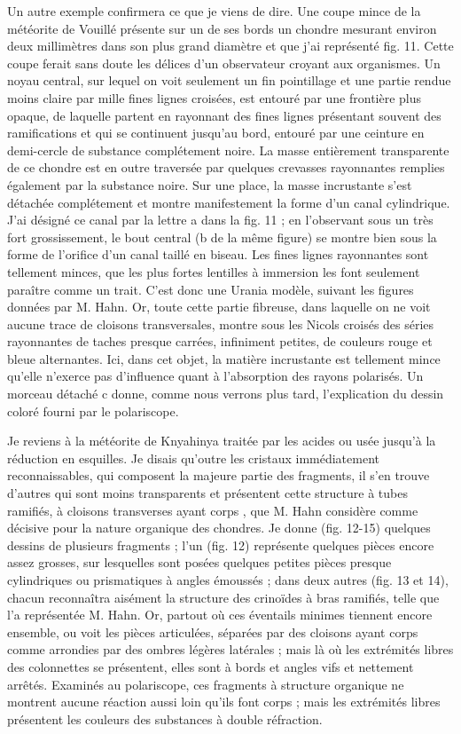\documentclass[a4paper, 12pt, oneside, french]{article}
\begin{document}
Un autre exemple confirmera ce que je viens de dire. Une coupe mince de la météorite de Vouillé présente sur un de ses bords un chondre mesurant environ deux millimètres dans son plus grand diamètre et que j'ai représenté fig. 11. Cette coupe ferait sans doute les délices d'un observateur croyant aux organismes. Un noyau central, sur lequel on voit seulement un fin pointillage et une partie rendue moins claire par mille fines lignes croisées, est entouré par une frontière plus opaque, de laquelle partent en rayonnant des fines lignes présentant souvent des ramifications et qui se continuent jusqu'au bord, entouré par une ceinture en demi-cercle de substance complétement noire. La masse entièrement transparente de ce chondre est en outre traversée par quelques crevasses rayonnantes remplies également par la substance noire. Sur une place, la masse incrustante s'est détachée complétement et montre manifestement la forme d'un canal cylindrique. J'ai désigné ce canal par la lettre a dans la fig. 11 ; en l'observant sous un très fort grossissement, le bout central (b de la même figure) se montre bien sous la forme de l'orifice d'un canal taillé en biseau. Les fines lignes rayonnantes sont tellement minces, que les plus fortes lentilles à immersion les font seulement paraître comme un trait. C'est donc une Urania modèle, suivant les figures données par M. Hahn. Or, toute cette partie fibreuse, dans laquelle on ne voit aucune trace de cloisons transversales, montre sous les Nicols croisés des séries rayonnantes de taches presque carrées, infiniment petites, de couleurs rouge et bleue alternantes. Ici, dans cet objet, la matière incrustante est tellement mince qu'elle n'exerce pas d'influence quant à l'absorption des rayons polarisés. Un morceau détaché c donne, comme nous verrons plus tard, l'explication du dessin coloré fourni par le polariscope.

Je reviens à la météorite de Knyahinya traitée par les acides ou usée jusqu'à la réduction en esquilles. Je disais qu'outre les cristaux immédiatement reconnaissables, qui composent la majeure partie des fragments, il s'en trouve d'autres qui sont moins transparents et présentent cette structure à tubes ramifiés, à cloisons transverses \og ayant corps \fg, que M. Hahn considère comme décisive pour la nature organique des chondres. Je donne (fig. 12-15) quelques dessins de plusieurs fragments ; l'un (fig. 12) représente quelques pièces encore assez grosses, sur lesquelles sont posées quelques petites pièces presque cylindriques ou prismatiques à angles émoussés ; dans deux autres (fig. 13 et 14), chacun reconnaîtra aisément la structure des crinoïdes à bras ramifiés, telle que l'a représentée M. Hahn. Or, partout où ces éventails minimes tiennent encore ensemble, ou voit les pièces articulées, séparées par des cloisons \og ayant corps \fg comme arrondies par des ombres légères latérales ; mais là où les extrémités libres des colonnettes se présentent, elles sont à bords et angles vifs et nettement arrêtés. Examinés au polariscope, ces fragments à structure organique ne montrent aucune réaction aussi loin qu'ils font corps ; mais les extrémités libres présentent les couleurs des substances à double réfraction.
\end{document}
